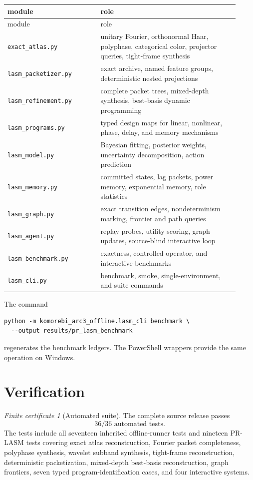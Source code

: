 \documentclass[11pt]{article}
\theoremstyle{remark}
\newtheorem{certificate}[definition]{Finite certificate}
\begin{document}
\begin{longtable}{L{0.37\linewidth}L{0.55\linewidth}}
\toprule
module&role\\
\midrule
\endfirsthead
\toprule
module&role\\
\midrule
\endhead
\texttt{exact\_atlas.py}&unitary Fourier, orthonormal Haar, polyphase, categorical color, projector queries, tight-frame synthesis\\
\texttt{lasm\_packetizer.py}&exact archive, named feature groups, deterministic nested projections\\
\texttt{lasm\_refinement.py}&complete packet trees, mixed-depth synthesis, best-basis dynamic programming\\
\texttt{lasm\_programs.py}&typed design maps for linear, nonlinear, phase, delay, and memory mechanisms\\
\texttt{lasm\_model.py}&Bayesian fitting, posterior weights, uncertainty decomposition, action prediction\\
\texttt{lasm\_memory.py}&committed states, lag packets, power memory, exponential memory, role statistics\\
\texttt{lasm\_graph.py}&exact transition edges, nondeterminism marking, frontier and path queries\\
\texttt{lasm\_agent.py}&replay probes, utility scoring, graph updates, source-blind interactive loop\\
\texttt{lasm\_benchmark.py}&exactness, controlled operator, and interactive benchmarks\\
\texttt{lasm\_cli.py}&benchmark, smoke, single-environment, and suite commands\\
\bottomrule
\end{longtable}

The command
\begin{lstlisting}
python -m komorebi_arc3_offline.lasm_cli benchmark \
  --output results/pr_lasm_benchmark
\end{lstlisting}
regenerates the benchmark ledgers.  The PowerShell wrappers provide the same operation on Windows.

\section{Verification}

\begin{certificate}[Automated suite]
The complete source release passes
\[
\boxed{36/36\text{ automated tests}.}
\]
The tests include all seventeen inherited offline-runner tests and nineteen PR-LASM tests covering exact atlas reconstruction, Fourier packet completeness, polyphase synthesis, wavelet subband synthesis, tight-frame reconstruction, deterministic packetization, mixed-depth best-basis reconstruction, graph frontiers, seven typed program-identification cases, and four interactive systems.
\end{certificate}
\end{document}
